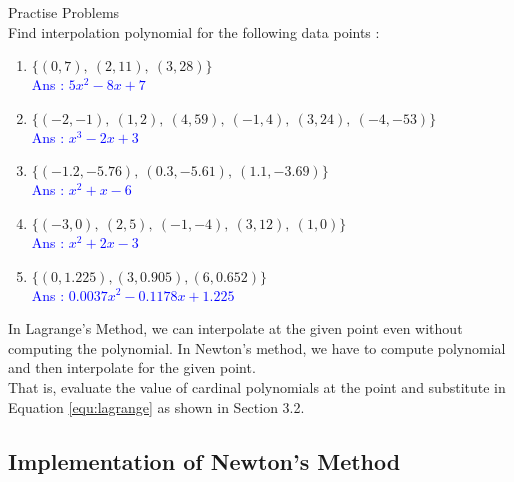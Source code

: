 \begin{remark}
	Practise Problems\\
	Find interpolation polynomial for the following data points :
	\begin{enumerate}
		\item $\{(0,7),\ (2,11),\ (3,28)\}$\\ \textcolor{blue}{Ans : $5x^2-8x+7$} \\ \cite[Example 3.1]{kiusalaas}
		\item $\{(-2,-1),\ (1,2),\ (4,59),\ (-1,4),\ (3,24),\ (-4,-53) \}$\\ \textcolor{blue}{Ans : $x^3-2x+3$}\\ \cite[Example 3.2]{kiusalaas}
		\item $\{(-1.2,-5.76),\ (0.3,-5.61),\ (1.1,-3.69)\}$\\ \textcolor{blue}{Ans : $x^2+x-6$}\\ \cite[Problem Set 3.1.1]{kiusalaas}
		\item $\{(-3,0),\ (2,5),\ (-1,-4),\ (3,12),\ (1,0)\}$\\ \textcolor{blue}{Ans : $x^2+2x-3$}\\ \cite[Problem Set 3.1.7]{kiusalaas}
		\item $\{(0,1.225),(3,0.905),(6,0.652)\}$\\ \textcolor{blue}{Ans : $0.0037x^2-0.1178x+1.225$}\\ \cite[Problem Set 3.1.9]{kiusalaas}
	\end{enumerate}
\end{remark}

\begin{remark}
	In Lagrange's Method, we can interpolate at the given point even without computing the polynomial. In Newton's method, we have to compute polynomial and then interpolate for the given point.\\

	That is, evaluate the value of cardinal polynomials at the point and substitute in Equation \ref{equ:lagrange} as shown in Section 3.2.\cite[Example 3.1]{kiusalaas}
\end{remark}

\subsection{Implementation of Newton's Method}

